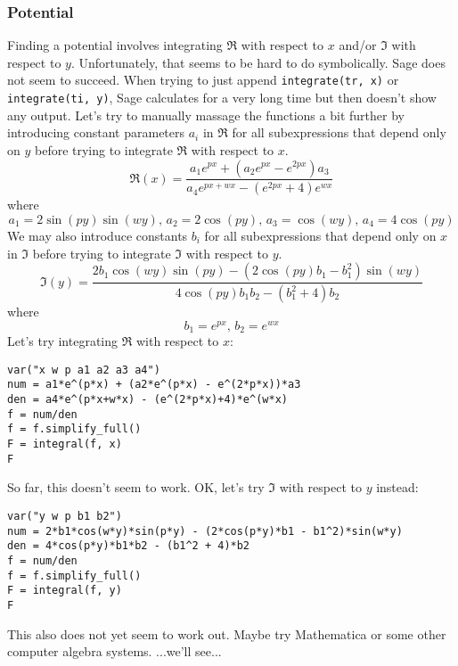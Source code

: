 \documentclass[12pt]{article}
\begin{document}


\subsubsection{Potential}
Finding a potential involves integrating $\Re$ with respect to $x$ and/or $\Im$ with respect to $y$. Unfortunately, that seems to be hard to do symbolically. Sage does not seem to succeed. When trying to just append \texttt{integrate(tr, x)} or \texttt{integrate(ti, y)}, Sage calculates for a very long time but then doesn't show any output. Let's try to manually massage the functions a bit further by introducing constant parameters $a_i$ in $\Re$ for all subexpressions that depend only on $y$ before trying to integrate $\Re$ with respect to $x$. 
\begin{equation}
\Re(x)
= \frac{a_1 e^{p x} + ( a_2 e^{p x} - e^{2 p x}) a_3 }
       {a_4 e^{p x + w x} - (e^{2 p x} + 4) e^{w x}}
\end{equation}
where
\begin{equation}
a_1 = 2 \sin(p y) \sin(w y), \,
a_2 = 2 \cos(p y), \,
a_3 = \cos(w y), \,
a_4 = 4 \cos(p y) 
\end{equation}
We may also introduce constants $b_i$ for all subexpressions that depend only on $x$ in $\Im$ before trying to integrate $\Im$ with respect to $y$.
\begin{equation}
\Im(y)
= \frac{2 b_1 \cos(w y) \sin(p y) - (2 \cos(p y) b_1 - b_1^2) \sin(w y)}
{4 \cos(p y) b_1 b_2 - (b_1^2 + 4) b_2}
\end{equation}
where
\begin{equation}
b_1 = e^{p x}, \,
b_2 = e^{w x}
\end{equation}
Let's try integrating $\Re$ with respect to $x$:
\begin{verbatim}
var("x w p a1 a2 a3 a4")
num = a1*e^(p*x) + (a2*e^(p*x) - e^(2*p*x))*a3
den = a4*e^(p*x+w*x) - (e^(2*p*x)+4)*e^(w*x)
f = num/den
f = f.simplify_full()
F = integral(f, x)
F
\end{verbatim}
So far, this doesn't seem to work. OK, let's try $\Im$ with respect to $y$ instead:
\begin{verbatim}
var("y w p b1 b2")
num = 2*b1*cos(w*y)*sin(p*y) - (2*cos(p*y)*b1 - b1^2)*sin(w*y)
den = 4*cos(p*y)*b1*b2 - (b1^2 + 4)*b2
f = num/den
f = f.simplify_full()
F = integral(f, y)
F
\end{verbatim}
This also does not yet seem to work out. Maybe try Mathematica or some other computer algebra systems. ...we'll see...
\end{document}
